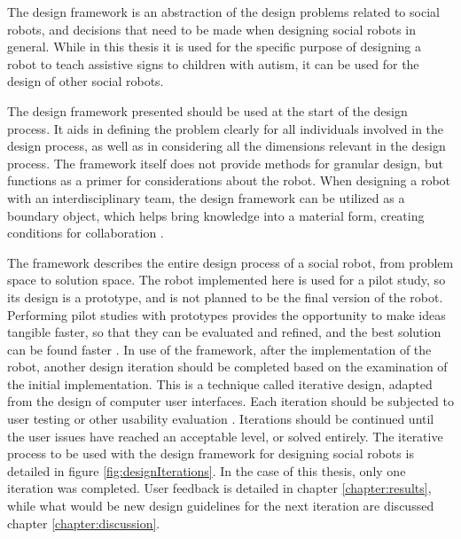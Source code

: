 The design framework is an abstraction of the design problems related to social robots, and decisions that need to be made when designing social robots in general. While in this thesis it is used for the specific purpose of designing a robot to teach assistive signs to children with autism, it can be used for the design of other social robots.

The design framework presented should be used at the start of the design process. It aids in defining the problem clearly for all individuals involved in the design process, as well as in considering all the dimensions relevant in the design process. The framework itself does not provide methods for granular design, but functions as a primer for considerations about the robot. When designing a robot with an interdisciplinary team, the design framework can be utilized as a boundary object, which helps bring knowledge into a material form, creating conditions for collaboration \cite{nicolini2012understanding}.

The framework describes the entire design process of a social robot, from problem space to solution space. The robot implemented here is used for a pilot study, so its design is a prototype, and is not planned to be the final version of the robot. Performing pilot studies with prototypes provides the opportunity to make ideas tangible faster, so that they can be evaluated and refined, and the best solution can be found faster \cite{brown2009change}. In use of the framework, after the implementation of the robot, another design iteration should be completed based on the examination of the initial implementation. This is a technique called iterative design, adapted from the design of computer user interfaces. Each iteration should be subjected to user testing or other usability evaluation \cite{nielsen1993iterative}. Iterations should be continued until the user issues have reached an acceptable level, or solved entirely. The iterative process to be used with the design framework for designing social robots is detailed in figure \ref{fig:designIterations}. In the case of this thesis, only one iteration was completed. User feedback is detailed in chapter \ref{chapter:results}, while what would be new design guidelines for the next iteration are discussed chapter \ref{chapter:discussion}.

